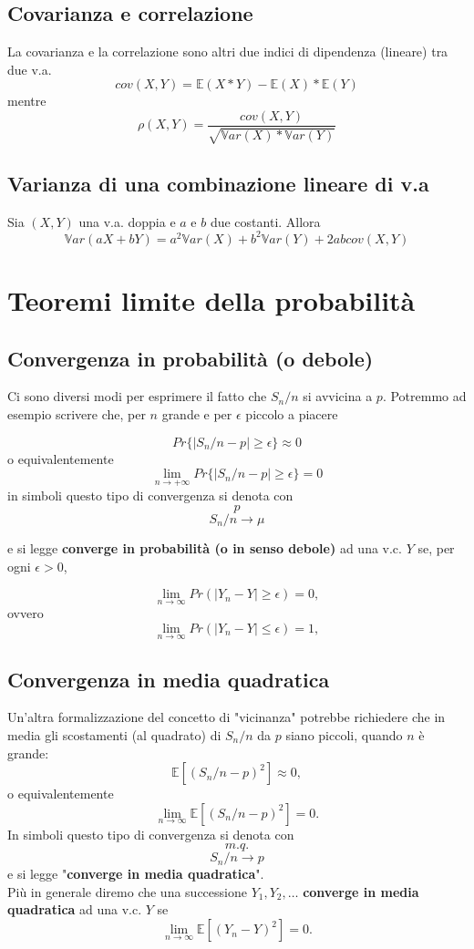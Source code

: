 \documentclass[a4paper]{report}
\begin{document}
  \section{Covarianza e correlazione}
  La covarianza e la correlazione sono altri due indici di dipendenza (lineare) tra due v.a.
  \[ cov(X,Y) = \mathbb{E}(X * Y) - \mathbb{E}(X) * \mathbb{E}(Y) \]
  mentre
  \[ \rho(X,Y) = \frac{cov(X,Y)}{\sqrt{\mathbb{V}ar(X)*\mathbb{V}ar(Y)}} \]

  \section{Varianza di una combinazione lineare di v.a}
  Sia $(X,Y)$ una v.a. doppia e $a$ e $b$ due costanti. Allora
  \[ \mathbb{V}ar(aX + bY)= a^2\mathbb{V}ar(X) + b^2\mathbb{V}ar(Y) + 2abcov(X,Y) \]


  \chapter{Teoremi limite della probabilità}
  \section{Convergenza in probabilità (o debole)}
  Ci sono diversi modi per esprimere il fatto che $S_n/n$ si avvicina a $p$. Potremmo ad esempio scrivere che, per $n$ grande e per $\epsilon$ piccolo a piacere

  \[ Pr\{ |S_n/n -p| \geq \epsilon \} \approx 0 \]
  o equivalentemente
  \[ \lim_{n \rightarrow +\infty} Pr\{ |S_n/n -p| \geq \epsilon \} = 0 \]
  in simboli questo tipo di convergenza si denota con
  \[ p \]
  \[ S_n/n \longrightarrow \mu \]

  e si legge \textbf{converge in probabilità (o in senso debole)} ad una v.c. $Y$ se, per ogni $\epsilon > 0$,

  \[ \lim_{n \to \infty} Pr(|Y_n - Y| \geq \epsilon) = 0, \]
  ovvero
  \[ \lim_{n \to \infty} Pr(|Y_n - Y| \leqslant \epsilon) = 1, \]

  \section{Convergenza in media quadratica}
  Un'altra formalizzazione del concetto di "vicinanza" potrebbe richiedere che in media gli scostamenti (al quadrato) di $S_n/n$ da $p$ siano piccoli, quando $n$ è grande:
  \[\mathbb{E}[(S_n/n - p)^2] \approx 0, \]
  o equivalentemente
  \[ \lim_{n \to \infty} \mathbb{E}[(S_n/n - p)^2] = 0. \]
  In simboli questo tipo di convergenza si denota con
  \[ m.q. \]
  \[ S_n/n \longrightarrow p \]
  e si legge "\textbf{converge in media quadratica}".\\
  Più in generale diremo che una successione $Y_1,Y_2,\dots$ \textbf{converge in media quadratica} ad una v.c. $Y$ se
  \[ \lim_{n \to \infty} \mathbb{E}[(Y_n - Y)^2] = 0. \]
\end{document}
